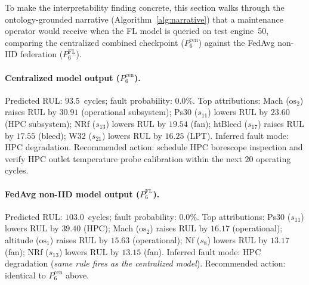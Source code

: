 \documentclass[preprint,12pt,authoryear]{elsarticle}
\begin{document}
To make the interpretability finding concrete, this section walks
through the ontology-grounded narrative (Algorithm~\ref{alg:narrative})
that a maintenance operator would receive when the FL model is queried
on test engine~50, comparing the centralized combined checkpoint
($P_6^{\mathrm{cen}}$) against the FedAvg non-IID federation
($P_6^{\mathrm{FL}}$).

\paragraph{Centralized model output ($P_6^{\mathrm{cen}}$).}
Predicted RUL: $93.5$~cycles; fault probability: $0.0\%$. Top
attributions: Mach ($\mathrm{os}_2$) raises RUL by $30.91$ (operational
subsystem); Ps30 ($s_{11}$) lowers RUL by $23.60$ (HPC subsystem); NRf
($s_{13}$) lowers RUL by $19.54$ (fan); htBleed ($s_{17}$) raises RUL
by $17.55$ (bleed); W32 ($s_{21}$) lowers RUL by $16.25$ (LPT).
Inferred fault mode: HPC degradation. Recommended action: schedule HPC
borescope inspection and verify HPC outlet temperature probe calibration
within the next $20$ operating cycles.

\paragraph{FedAvg non-IID model output ($P_6^{\mathrm{FL}}$).}
Predicted RUL: $103.0$~cycles; fault probability: $0.0\%$. Top
attributions: Ps30 ($s_{11}$) lowers RUL by $39.40$ (HPC); Mach
($\mathrm{os}_2$) raises RUL by $16.17$ (operational); altitude
($\mathrm{os}_1$) raises RUL by $15.63$ (operational); Nf ($s_8$) lowers
RUL by $13.17$ (fan); NRf ($s_{13}$) lowers RUL by $13.15$ (fan).
Inferred fault mode: HPC degradation (\emph{same rule fires as the
centralized model}). Recommended action: identical to
$P_6^{\mathrm{cen}}$ above.
\end{document}
